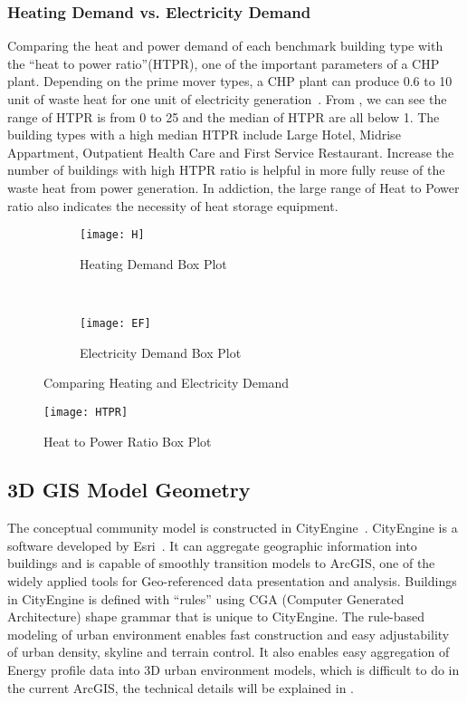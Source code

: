 \subsubsection{Heating Demand vs. Electricity Demand}
Comparing the heat and power demand of each benchmark building type
with the ``heat to power ratio''(HTPR), one of the important
parameters of a CHP plant. Depending on the prime mover types, a CHP
plant can produce 0.6 to 10 unit of waste heat for one unit of
electricity generation~\cite{introCHP2010}. From , we
can see the range of HTPR is from 0 to 25 and the median of HTPR are
all below 1. The building types with a high median HTPR include Large
Hotel, Midrise Appartment, Outpatient Health Care and First Service
Restaurant. Increase the number of buildings with high HTPR ratio is
helpful in more fully reuse of the waste heat from power
generation. In addiction, the large range of Heat to Power ratio also
indicates the necessity of heat storage equipment.
\begin{figure}[h!]
  \centering
  \begin{subfigure}{0.4\textwidth}
  \centering
  \texttt{[image: H]}
  \caption[Heating Demand Box Plot]{Heating Demand Box
    Plot}
  \label{fig:H}
\end{subfigure}
~
\begin{subfigure}{0.4\textwidth}
  \centering
  \texttt{[image: EF]}
  \caption[Electricity Demand Box Plot]{Electricity Demand Box Plot}
  \label{fig:EF2}
\end{subfigure}
\caption[Comparing Heating and Electricity Demand]{Comparing Heating
  and Electricity Demand}
\end{figure}

\begin{figure}[h!]
  \centering
  \texttt{[image: HTPR]}
  \caption[Heat to Power Ratio Box Plot]{Heat to Power Ratio Box Plot}
  \label{fig:HTPR}
\end{figure}%

\pagebreak
\subsection{3D GIS Model Geometry}
The conceptual community model is constructed in
CityEngine~\cite{cityEngine2015}. CityEngine is a software developed
by Esri~\cite{Esri2015}. It can aggregate geographic information into
buildings and is capable of smoothly transition models to
ArcGIS\cite{ArcGIS2015}, one of the widely applied tools for
Geo-referenced data presentation and analysis. Buildings in CityEngine
is defined with ``rules'' using CGA (Computer Generated Architecture)
shape grammar that is unique to CityEngine. The rule-based modeling of
urban environment enables fast construction and easy adjustability of
urban density, skyline and terrain control. It also enables easy
aggregation of Energy profile data into 3D urban environment models,
which is difficult to do in the current ArcGIS, the technical details
will be explained in .

